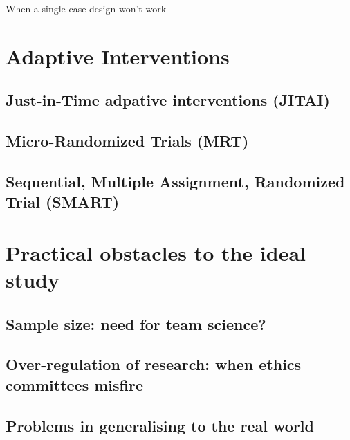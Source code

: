 \documentclass[]{book}
\begin{document}
When a single case design won't work

\hypertarget{adaptive-interventions}{%
\chapter{Adaptive Interventions}\label{adaptive-interventions}}

\hypertarget{just-in-time-adpative-interventions-jitai}{%
\section{Just-in-Time adpative interventions (JITAI)}\label{just-in-time-adpative-interventions-jitai}}

\hypertarget{micro-randomized-trials-mrt}{%
\section{Micro-Randomized Trials (MRT)}\label{micro-randomized-trials-mrt}}

\hypertarget{sequential-multiple-assignment-randomized-trial-smart}{%
\section{Sequential, Multiple Assignment, Randomized Trial (SMART)}\label{sequential-multiple-assignment-randomized-trial-smart}}

\hypertarget{practical-obstacles-to-the-ideal-study}{%
\chapter{Practical obstacles to the ideal study}\label{practical-obstacles-to-the-ideal-study}}

\hypertarget{sample-size-need-for-team-science}{%
\section{Sample size: need for team science?}\label{sample-size-need-for-team-science}}

\hypertarget{over-regulation-of-research-when-ethics-committees-misfire}{%
\section{Over-regulation of research: when ethics committees misfire}\label{over-regulation-of-research-when-ethics-committees-misfire}}

\hypertarget{problems-in-generalising-to-the-real-world}{%
\section{Problems in generalising to the real world}\label{problems-in-generalising-to-the-real-world}}
\end{document}
